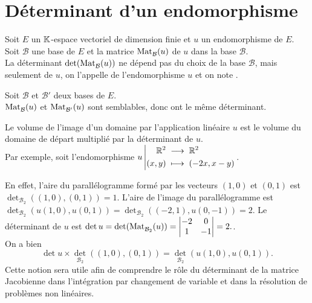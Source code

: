 \documentclass{book}
\begin{document}
\section{Déterminant d'un endomorphisme}
\begin{DefinitionProposition}
Soit $E$ un $\mathbb{K} $-espace vectoriel de dimension finie et $u$ un endomorphisme de $E$.\\
Soit $\mathcal{B}$ une base de $E$ et la matrice $\operatorname{Mat}_{\mathcal{B}}^{}(u)$ de $u$ dans la base $\mathcal{B}$.\\
La déterminant $\mathop{\mathrm{det}}\nolimits(\operatorname{Mat}_{\mathcal{B}}^{}(u))$ ne dépend pas du choix de la base $\mathcal{B}$, mais seulement de $u$, on l'appelle  de l'endomorphisme $u$ et on note .
\end{DefinitionProposition}
\begin{Demonstration}
Soit $\mathcal{B}$ et $\mathcal{B}'$ deux bases de $E$.\\
$\operatorname{Mat}_{\mathcal{B}}^{}(u)$ et $\operatorname{Mat}_{\mathcal{B}'}^{}(u)$ sont semblables, donc ont le même
déterminant.
\end{Demonstration}
\begin{Remarque}
Le volume de l'image d'un domaine par l'application linéaire $u$ est le volume du domaine de départ multiplié par la déterminant de $u$. \\
Par exemple, soit l'endomorphisme ${u}\left|\begin{aligned}{\mathbb{R}^2}&\;\longrightarrow\;{\mathbb{R}^2}\\{(x,y)}&\;\longmapsto\;{(-2x,x-y)}\end{aligned}\right.$.
\begin{center}
\end{center}
En effet, l'aire du parallélogramme formé par les vecteurs $(1,0)$ et $(0,1)$  est $\det_{\mathcal{B}_2}( (1,0),(0,1))=1$.
L'aire de l'image  du parallélogramme est $\det_{\mathcal{B}_2}( u(1,0),u(0,1))=\det_{\mathcal{B}_2}( (-2,1),u(0,-1))=2$. Le déterminant de $u$ est  $\mathop{\mathrm{det}}\nolimits u = \mathop{\mathrm{det}}\nolimits(\operatorname{Mat}_{\mathcal{B}_2}^{}(u))=\begin{vmatrix}-2&0\\1&-1\\ \end{vmatrix}=2.$.\\
 On a bien $$
 \det u\times \det_{\mathcal{B}_2}( (1,0),(0,1))=\det_{\mathcal{B}_2}( u(1,0),u(0,1)).$$
 Cette notion sera utile afin de comprendre le rôle du déterminant de la matrice Jacobienne  dans  l'intégration par  changement de variable et dans la résolution de problèmes non linéaires.
\end{Remarque}
\end{document}
